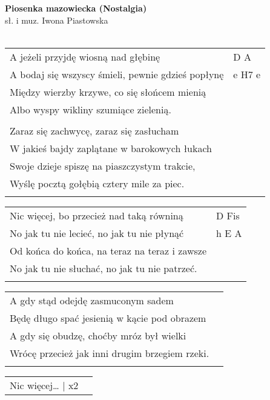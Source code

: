 \documentclass[a5paper]{article}
\begin{document}


\noindent
\fontsize{12pt}{15pt}\selectfont
\textbf{Piosenka mazowiecka (Nostalgia) } \\
\fontsize{8pt}{10pt}\selectfont
sł. i muz. Iwona Piastowska \\ \\
\fontsize{10pt}{12pt}\selectfont
{}
\begin{tabular}{@{}p{8.50cm}p{3cm}@{}}
\noindent
A jeżeli przyjdę wiosną nad głębinę & D A \\
A bodaj się wszyscy śmieli, pewnie gdzieś popłynę & e H7 e \\
Między wierzby krzywe, co się słońcem mienią \\
Albo wyspy wikliny szumiące zielenią. \\ \\

Zaraz się zachwycę, zaraz się zasłucham \\
W jakieś bajdy zaplątane w barokowych łukach \\
Swoje dzieje spiszę na piaszczystym trakcie,\\
Wyślę pocztą gołębią cztery mile za piec.\\ \\
\end{tabular}

\noindent
\begin{tabular}{@{}p{7.50cm}p{3cm}@{}}
        Nic więcej, bo przecież nad taką równiną & D Fis \\
        No jak tu nie lecieć, no jak tu nie płynąć & h E A \\
        Od końca do końca, na teraz na teraz i zawsze \\
        No jak tu nie słuchać, no jak tu nie patrzeć. \\ \\
\end{tabular}

\noindent
\begin{tabular}{@{}p{7.50cm}p{3cm}@{}}
A gdy stąd odejdę zasmuconym sadem \\
Będę długo spać jesienią w kącie pod obrazem\\
A gdy się obudzę, choćby mróz był wielki\\
Wrócę przecież jak inni drugim brzegiem rzeki.\\ \\
\end{tabular}

\noindent
\begin{tabular}{@{}p{7.50cm}p{3cm}@{}}
        Nic więcej… | x2
\end{tabular}
\end{document}
